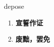 
\begin{frame}
{\huge depose}
\begin{center}
\begin{enumerate}\Large
  \item \textbf{宣誓作证}
  \item \textbf{废黜，罢免}
\end{enumerate}
\end{center}
\end{frame}
